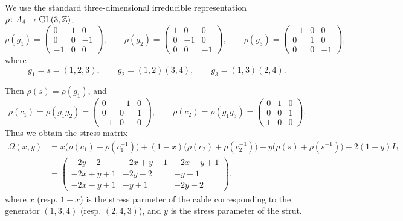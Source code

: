 \documentclass[12pt]{article}
\begin{document}
We use the standard three-dimensional irreducible representation
$\rho\colon A_4\to {\rm GL}(3,\mathbb{Z})$.
\[
 \rho(g_1) =
 \begin{pmatrix}
  0 & 1 & 0\\
  0 & 0 & -1\\
  -1 & 0 & 0
 \end{pmatrix},
 \qquad
 \rho(g_2) =
 \begin{pmatrix}
  1 & 0 & 0\\
  0 & -1 & 0\\
  0 & 0 & -1
 \end{pmatrix},
 \qquad
 \rho(g_3) =
 \begin{pmatrix}
  -1 & 0 & 0\\
  0 & 1 & 0\\
  0 & 0 & -1
 \end{pmatrix},
\]
where
\[
 g_1=s=(1,2,3), \qquad g_2=(1,2)(3,4), \qquad g_3=(1,3)(2,4).
\]

Then $\rho(s)=\rho(g_1)$, and
\[
 \rho(c_1)=\rho(g_1g_2)
 =
 \begin{pmatrix}
  0 & -1 & 0\\
  0 & 0 & 1\\
  -1 & 0 & 0
 \end{pmatrix},
 \qquad
 \rho(c_2)=\rho(g_1g_3)
 =
 \begin{pmatrix}
  0 & 1 & 0\\
  0 & 0 & 1\\
  1 & 0 & 0
 \end{pmatrix}.
\]
Thus we obtain the stress matrix
\begin{align*}
 \Omega(x,y)
 &= x\bigl(\rho(c_1)+\rho(c_1^{-1})\bigr)
  + (1-x)\bigl(\rho(c_2)+\rho(c_2^{-1})\bigr)
  + y\bigl(\rho(s)+\rho(s^{-1})\bigr)
  - 2(1+y)I_3 \\
 &=
 \begin{pmatrix}
  -2y-2 & -2x+y+1 & -2x-y+1 \\
  -2x+y+1 & -2y-2 & -y+1 \\
  -2x-y+1 & -y+1 & -2y-2
 \end{pmatrix},
\end{align*}
where $x$ (resp. $1-x$) 
is the stress parmeter 
of the cable corresponding to the generator $(1,3,4)$
(resp. $(2,4,3)$),
and $y$ is the stress parameter 
of the strut.
\end{document}
